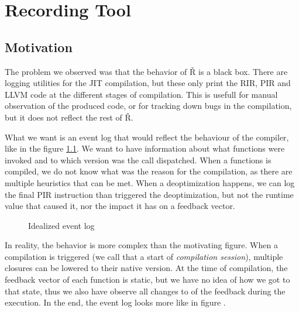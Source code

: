 \chapter{Recording Tool}\label{ch:recording-tool}

\begin{chapterabstract}
	\todoadd
\end{chapterabstract}

\section{Motivation}

The problem we observed was that the behavior of Ř is a black box. There are logging utilities for the JIT compilation, but these only print the RIR, PIR and LLVM code at the different stages of compilation. This is usefull for manual observation of the produced code, or for tracking down bugs in the compilation, but it does not reflect the rest of Ř.

What we want is an event log that would reflect the behaviour of the compiler, like in the figure \ref{fig:motivation-events}. We want to have information about what functions were invoked and to which version was the call dispatched. When a functions is compiled, we do not know what was the reason for the compilation, as there are multiple heuristics that can be met. When a deoptimization happens, we can log the final PIR instruction than triggered the deoptimization, but not the runtime value that caused it, nor the impact it has on a feedback vector.

\begin{figure}[H]
	\centering
	\begin{adjustwidth}{-3cm}{-3cm}
	\end{adjustwidth}
	\caption{Idealized event log}\label{fig:motivation-events}
\end{figure}


In reality, the behavior is more complex than the motivating figure. When a compilation is triggered (we call that a start of \textit{compilation session}), multiple closures can be lowered to their native version. At the time of compilation, the feedback vector of each function is static, but we have no idea of how we got to that state, thus we also have observe all changes to of the feedback during the execution. In the end, the event log looks more like in figure \todoadd.

